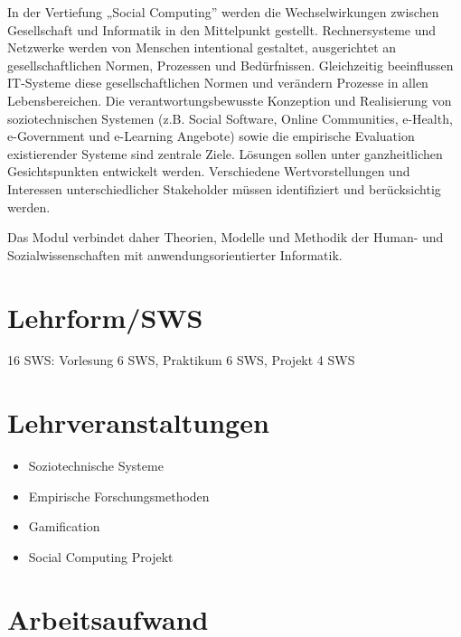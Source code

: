 In der Vertiefung „Social Computing'' werden die Wechselwirkungen
zwischen Gesellschaft und Informatik in den Mittelpunkt gestellt.
Rechnersysteme und Netzwerke werden von Menschen intentional gestaltet,
ausgerichtet an gesellschaftlichen Normen, Prozessen und Bedürfnissen.
Gleichzeitig beeinflussen IT-Systeme diese gesellschaftlichen Normen und
verändern Prozesse in allen Lebensbereichen. Die verantwortungsbewusste
Konzeption und Realisierung von soziotechnischen Systemen (z.B. Social
Software, Online Communities, e-Health, e-Government und e-Learning
Angebote) sowie die empirische Evaluation existierender Systeme sind
zentrale Ziele. Lösungen sollen unter ganzheitlichen Gesichtspunkten
entwickelt werden. Verschiedene Wertvorstellungen und Interessen
unterschiedlicher Stakeholder müssen identifiziert und berücksichtig
werden.

Das Modul verbindet daher Theorien, Modelle und Methodik der Human- und
Sozialwissenschaften mit anwendungsorientierter Informatik.

\section*{Lehrform/SWS\label{/mi-2017/modulbeschreibungen-bachelor/BA_Vertiefung_SocialComputing}}\label{lehrformswspathlabelmi-2017modulbeschreibungen-bachelorbaux5fvertiefungux5fsocialcomputing}

16 SWS: Vorlesung 6 SWS, Praktikum 6 SWS, Projekt 4 SWS

\section*{Lehrveranstaltungen\label{/mi-2017/modulbeschreibungen-bachelor/BA_Vertiefung_SocialComputing}}\label{lehrveranstaltungenpathlabelmi-2017modulbeschreibungen-bachelorbaux5fvertiefungux5fsocialcomputing}

\begin{itemize}
\tightlist
\item
  Soziotechnische Systeme
\item
  Empirische Forschungsmethoden
\item
  Gamification
\item
  Social Computing Projekt
\end{itemize}

\section*{Arbeitsaufwand\label{/mi-2017/modulbeschreibungen-bachelor/BA_Vertiefung_SocialComputing}}\label{arbeitsaufwandpathlabelmi-2017modulbeschreibungen-bachelorbaux5fvertiefungux5fsocialcomputing}

